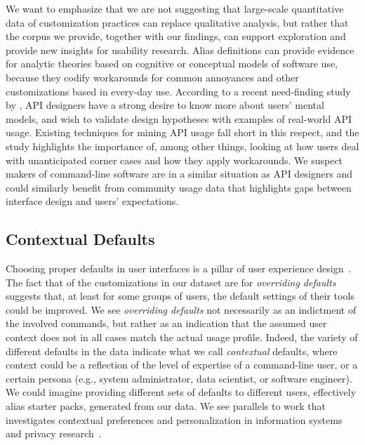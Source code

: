 \documentclass[smallextended,natbib]{svjour3}
\newcommand{\per}[1]{\numprint[\%]{#1}}
\begin{document}
We want to emphasize that we are not suggesting that large-scale quantitative data of customization practices can replace qualitative analysis, but rather that the corpus we provide, together with our findings, can support exploration and provide new insights for usability research.
Alias definitions can provide evidence for analytic theories based on cognitive or conceptual models of software use, because they codify workarounds for common annoyances and other customizations based in every-day use.
According to a recent need-finding study by \cite{zhang:20}, API designers have a strong desire to know more about users' mental models, and wish to validate design hypotheses with examples of real-world API usage.
Existing techniques for mining API usage fall short in this respect, and the study highlights the importance of, among other things, looking at how users deal with unanticipated corner cases and how they apply workarounds.
We suspect makers of command-line software are in a similar situation as API designers and could similarly benefit from community usage data that highlights gaps between interface design and users' expectations.

\subsection{Contextual Defaults}
\label{sec:contextual-defaults}

Choosing proper defaults in user interfaces is a pillar of user experience design~\citep{nielsen2005power}.
The fact that \per{14.48} of the customizations in our dataset are for \emph{overriding defaults} suggests that, at least for some groups of users, the default settings of their tools could be improved.
We see \emph{overriding defaults} not necessarily as an indictment of the involved commands, but rather as an indication that the assumed user context does not in all cases match the actual usage profile.
Indeed, the variety of different defaults in the data indicate what we call \emph{contextual} defaults, where context could be a reflection of the level of expertise of a command-line user, or a certain persona (e.g., system administrator, data scientist, or software engineer).
We could imagine providing different sets of defaults to different users, effectively alias starter packs, generated from our data.
We see parallels to work that investigates contextual preferences and personalization in information systems~\citep{de:15, stefanidis:11} and privacy research~\citep{wijesekera:18, alom:19}.
\end{document}
